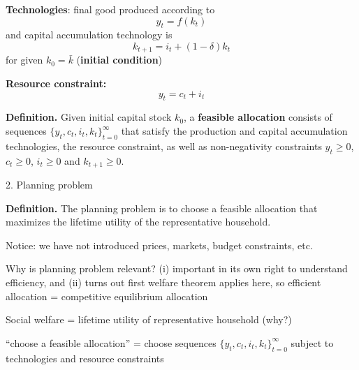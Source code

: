 \documentclass[11pt, aspectratio=169]{beamer}
\newenvironment{witemize}{\itemize\addtolength{\itemsep}{10pt}}{\enditemize}
\begin{document}
\begin{frame}{}
\begin{witemize}
\item \textbf{Technologies}: final good produced according to 
\begin{equation*}
	y_t = f(k_t)
\end{equation*}
and capital accumulation technology is 
\begin{equation*}
	k_{t+1} = i_t + (1 - \delta) k_t 
\end{equation*}
for given $k_0 = \bar k$ (\textbf{initial condition})

\item \textbf{Resource constraint:}
\begin{equation*}
	y_t = c_t + i_t
\end{equation*}
\end{witemize}

\vspace{4mm}
\textbf{Definition.} Given initial capital stock $k_0$, a \textbf{feasible allocation} consists of sequences $\{y_t, c_t, i_t, k_t\}_{t = 0}^\infty$ that satisfy the production and capital accumulation technologies, the resource constraint, as well as non-negativity constraints $y_t \geq 0$, $c_t \geq 0$, $i_t \geq 0$ and $k_{t+1} \geq 0$.

\end{frame}


\begin{frame}{2. Planning problem}

\vspace{4mm}
\textbf{Definition.} The planning problem is to choose a feasible allocation that maximizes the lifetime utility of the representative household.  

\vspace{5mm}
\begin{witemize}
\item Notice: we have not introduced prices, markets, budget constraints, etc.

\item Why is planning problem relevant? (i) important in its own right to understand efficiency, and (ii) turns out first welfare theorem applies here, so efficient allocation = competitive equilibrium allocation

\item Social welfare = lifetime utility of representative household (why?)

\item ``choose a feasible allocation'' = choose sequences $\{y_t, c_t, i_t, k_t\}_{t = 0}^\infty$ subject to technologies and resource constraints
\end{witemize}
\end{frame}
\end{document}
